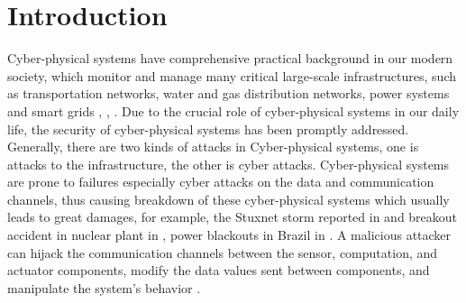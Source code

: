 \documentclass[english]{cccconf}
\theoremstyle{definition}
\begin{document}
\section{Introduction}
Cyber-physical systems have comprehensive practical background in our modern society, which monitor and manage many critical large-scale infrastructures, such as transportation networks, water and gas distribution networks, power systems and smart grids \cite{Metke2010Security}, \cite{Slay2007Lessons}, \cite{Sridhar2012Cyber}. Due to the crucial role of cyber-physical systems in our daily life, the security of cyber-physical systems has been promptly addressed. Generally, there are two kinds of attacks in Cyber-physical systems, one is attacks to the infrastructure, the other is cyber attacks. Cyber-physical systems are prone to failures especially cyber attacks on the data and communication channels, thus causing breakdown of these cyber-physical systems which usually leads to great damages, for example, the Stuxnet storm reported in \cite{Langner2011Stuxnet} and breakout accident in nuclear plant in \cite{Lee2010Lessons}, power blackouts in Brazil in \cite{Conti2010The}. A malicious attacker can hijack the communication channels between the sensor, computation, and actuator components, modify the data values sent between components, and manipulate the system’s behavior \cite{Andr2012Attack}.
\end{document}
